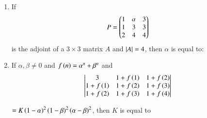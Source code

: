 \documentclass[journal,12pt,twocolumn]{IEEEtran}
\theoremstyle{remark}
\begin{document}
\begin{enumerate}
	\item If \begin{align*}
		P = \begin{pmatrix}1&\alpha&3\\
		1&3&3\\
		2&4&4\end{pmatrix}
	\end{align*} is the adjoint of a $3\times3$ matrix $A$ and $\left\vert A\right\vert = 4$, then $\alpha$ is equal to:
	\hfill{}
        \begin{enumerate}
        \end{enumerate}

	\item If $\alpha,\beta\neq 0$ and $f\left(n\right) = \alpha^n + \beta^n$ and
		\newline
		\begin{align*}
			\begin{vmatrix}
				3 & 1+f\left(1\right) & 1+f\left(2\right)\\
				1+f\left(1\right) & 1+f\left(2\right) & 1+f\left(3\right)\\
				1+f\left(2\right) & 1+f\left(3\right) & 1+f\left(4\right)
			\end{vmatrix}
		\end{align*}

		$=K\left(1-\alpha\right)^2\left(1-\beta\right)^2\left(\alpha-\beta\right)^2$,
		then $K$ is equal to

	\hfill{}
        \begin{enumerate}
        \end{enumerate}



\end{enumerate}
\end{document}
